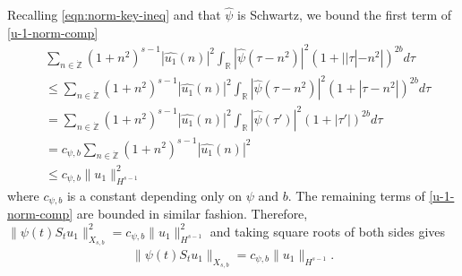 \documentclass[12pt,reqno]{amsart}
\numberwithin{equation}{section}  %
\numberwithin{figure}{section}
\newcommand{\rr}{\mathbb{R}}
\newcommand{\zz}{\mathbb{Z}}
\newcommand{\wh}{\widehat}
\theoremstyle{plain}
\theoremstyle{definition}
\theoremstyle{remark}
\begin{document}
%
%
%
Recalling \eqref{eqn:norm-key-ineq} 
and that $\wh{\psi}$ is Schwartz, we bound the first term of
\eqref{u-1-norm-comp}  
%
%
\begin{equation*}
  \begin{split}
    & \sum_{n \in \dot{\zz}} \left( 1 + n^{2} \right)^{s-1} | \wh{u_{1}}(n)
    |^{2} \int_{\rr} | \wh{\psi}(\tau - n^{2}) |^{2}\left( 1 + | | \tau | -
    n^{2} | \right)^{2b} d \tau
    \\
    & \le  \sum_{n \in \dot{\zz}} \left( 1 + n^{2} \right)^{s-1} | \wh{u_{1}}(n)
    |^{2} \int_{\rr} | \wh{\psi}(\tau - n^{2}) |^{2}\left( 1 +  | \tau  -
    n^{2} | \right)^{2b} d \tau
    \\
    & = \sum_{n \in \dot{\zz}} \left( 1 + n^{2} \right)^{s-1} | \wh{u_{1}}(n)
    |^{2} \int_{\rr} | \wh{\psi}(\tau') |^{2}\left( 1 +  | \tau'| \right)^{2b} d \tau
    \\
    & = c_{\psi, b} \sum_{n \in \dot{\zz}} \left( 1 + n^{2} \right)^{s-1} | \wh{u_{1}}(n)
    |^{2} 
    \\
    & \le c_{\psi, b} \| u_{1} \|_{H^{s-1}}^{2}
  \end{split}
\end{equation*}
%
%
where $c_{\psi, b}$ is a constant depending only on $\psi$ and $b$. The
remaining terms of \eqref{u-1-norm-comp} are bounded in similar fashion.  
Therefore, 
$\|\psi(t) S_{t} u_{1}\|_{X_{s,b}}^{2} = c_{\psi, b}
\|u_{1}\|_{H^{s-1}}^2$ and
taking square roots of both sides gives
%
%
\begin{equation}
  \begin{split}
    \|\psi(t) S_{t} u_{1}\|_{X_{s,b}} = c_{\psi, b}
    \|u_{1}\|_{H^{s-1}}.
  \end{split}
  \label{eqn:u-1-fin-est}
\end{equation}
\end{document}
